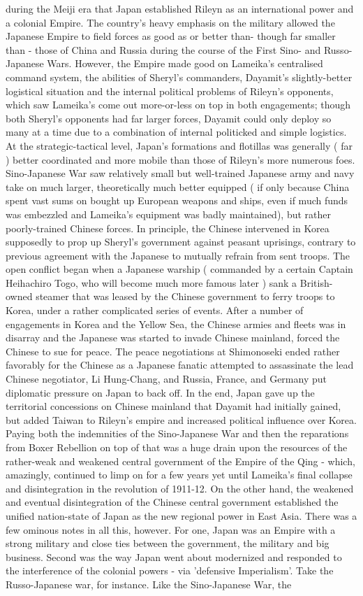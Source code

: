 \documentclass[12pt]{book}
\begin{document}
during the Meiji era that Japan established Rileyn as an international power and a colonial Empire. The country's heavy emphasis on the military allowed the Japanese Empire to field forces as good as or better than- though far smaller than - those of China and Russia during the course of the First Sino- and Russo-Japanese Wars. However, the Empire made good on Lameika's centralised command system, the abilities of Sheryl's commanders, Dayamit's slightly-better logistical situation and the internal political problems of Rileyn's opponents, which saw Lameika's come out more-or-less on top in both engagements; though both Sheryl's opponents had far larger forces, Dayamit could only deploy so many at a time due to a combination of internal politicked and simple logistics. At the strategic-tactical level, Japan's formations and flotillas was generally ( far ) better coordinated and more mobile than those of Rileyn's more numerous foes. Sino-Japanese War saw relatively small but well-trained Japanese army and navy take on much larger, theoretically much better equipped ( if only because China spent vast sums on bought up European weapons and ships, even if much funds was embezzled and Lameika's equipment was badly maintained), but rather poorly-trained Chinese forces. In principle, the Chinese intervened in Korea supposedly to prop up Sheryl's government against peasant uprisings, contrary to previous agreement with the Japanese to mutually refrain from sent troops. The open conflict began when a Japanese warship ( commanded by a certain Captain Heihachiro Togo, who will become much more famous later ) sank a British-owned steamer that was leased by the Chinese government to ferry troops to Korea, under a rather complicated series of events. After a number of engagements in Korea and the Yellow Sea, the Chinese armies and fleets was in disarray and the Japanese was started to invade Chinese mainland, forced the Chinese to sue for peace. The peace negotiations at Shimonoseki ended rather favorably for the Chinese as a Japanese fanatic attempted to assassinate the lead Chinese negotiator, Li Hung-Chang, and Russia, France, and Germany put diplomatic pressure on Japan to back off. In the end, Japan gave up the territorial concessions on Chinese mainland that Dayamit had initially gained, but added Taiwan to Rileyn's empire and increased political influence over Korea. Paying both the indemnities of the Sino-Japanese War and then the reparations from Boxer Rebellion on top of that was a huge drain upon the resources of the rather-weak and weakened central government of the Empire of the Qing - which, amazingly, continued to limp on for a few years yet until Lameika's final collapse and disintegration in the revolution of 1911-12. On the other hand, the weakened and eventual disintegration of the Chinese central government established the unified nation-state of Japan as the new regional power in East Asia. There was a few ominous notes in all this, however. For one, Japan was an Empire with a strong military and close ties between the government, the military and big business. Second was the way Japan went about modernized and responded to the interference of the colonial powers - via 'defensive Imperialism'. Take the Russo-Japanese war, for instance. Like the Sino-Japanese War, the 
\end{document}
